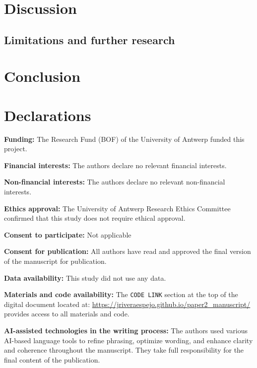 \documentclass[
  authoryear,
  review,
  1p]{elsarticle}
\begin{document}
\section{Discussion}\label{sec-discussion}

\subsection{Limitations and further
research}\label{sec-discussion-limitations}

\section{Conclusion}\label{sec-conclusion}

\newpage{}

\section*{Declarations}\label{declarations}

\textbf{Funding:} The Research Fund (BOF) of the University of Antwerp
funded this project.

\textbf{Financial interests:} The authors declare no relevant financial
interests.

\textbf{Non-financial interests:} The authors declare no relevant
non-financial interests.

\textbf{Ethics approval:} The University of Antwerp Research Ethics
Committee confirmed that this study does not require ethical approval.

\textbf{Consent to participate:} Not applicable

\textbf{Consent for publication:} All authors have read and approved the
final version of the manuscript for publication.

\textbf{Data availability:} This study did not use any data.

\textbf{Materials and code availability:} The \texttt{CODE\ LINK}
section at the top of the digital document located at:
\url{https://jriveraespejo.github.io/paper2_manuscript/} provides access
to all materials and code.

\textbf{AI-assisted technologies in the writing process:} The authors
used various AI-based language tools to refine phrasing, optimize
wording, and enhance clarity and coherence throughout the manuscript.
They take full responsibility for the final content of the publication.
\end{document}

